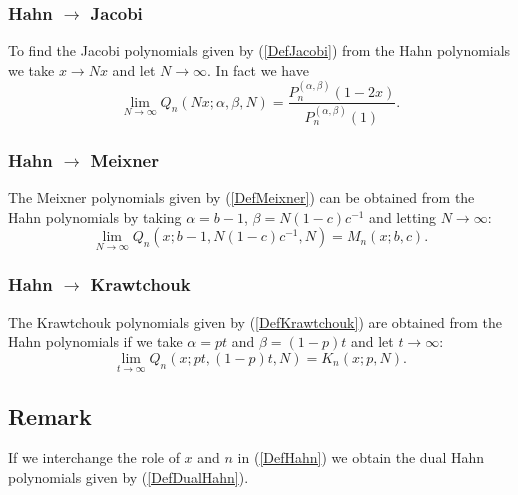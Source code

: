 \documentclass[envcountchap,graybox]{svmono}
\newcounter{rom}
\begin{document}
\subsubsection*{Hahn $\rightarrow$ Jacobi}
To find the Jacobi polynomials given by (\ref{DefJacobi}) from the Hahn polynomials we take
$x\rightarrow Nx$ and let $N\rightarrow\infty$. In fact we have
\begin{equation}
\lim_{N\rightarrow\infty}
Q_n(Nx;\alpha,\beta,N)=\frac{P_n^{(\alpha,\beta)}(1-2x)}{P_n^{(\alpha,\beta)}(1)}.
\end{equation}

\subsubsection*{Hahn $\rightarrow$ Meixner}
The Meixner polynomials given by (\ref{DefMeixner}) can be obtained from the Hahn polynomials
by taking $\alpha=b-1$, $\beta=N(1-c)c^{-1}$ and letting $N\rightarrow\infty$:
\begin{equation}
\lim_{N\rightarrow\infty}
Q_n(x;b-1,N(1-c)c^{-1},N)=M_n(x;b,c).
\end{equation}

\subsubsection*{Hahn $\rightarrow$ Krawtchouk}
The Krawtchouk polynomials given by (\ref{DefKrawtchouk}) are obtained from the Hahn polynomials
if we take $\alpha=pt$ and $\beta=(1-p)t$ and let $t\rightarrow\infty$:
\begin{equation}
\lim_{t\rightarrow\infty}Q_n(x;pt,(1-p)t,N)=K_n(x;p,N).
\end{equation}

\subsection*{Remark}
If we interchange the role of $x$ and $n$ in (\ref{DefHahn}) we obtain the
dual Hahn polynomials given by (\ref{DefDualHahn}).
\end{document}
